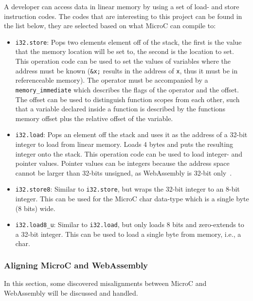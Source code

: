\documentclass[a4paper]{article}
\begin{document}
A developer can access data in linear memory by using a set of load- and store instruction codes. The codes that are interesting to this project can be found in the list below, they are selected based on what MicroC can compile to:
\begin{itemize}
	\item \texttt{i32.store}: Pops two elements element off of the stack, the first is the value that the memory location will be set to, the second is the location to set. This operation code can be used to set the values of variables where the address must be known (\texttt{\&x;} results in the address of \texttt{x}, thus it must be in referenceable memory). The operator must be accompanied by a \texttt{memory\_immediate}\cite[\#memory-related-operators]{website:wasm-binary-encoding} which describes the flags of the operator and the offset. The offset can be used to distinguish function scopes from each other, such that a variable declared inside a function is described by the functions memory offset plus the relative offset of the variable.
	\item \texttt{i32.load}: Pops an element off the stack and uses it as the address of a 32-bit integer to load from linear memory. Loads 4 bytes and puts the resulting integer onto the stack. This operation code can be used to load integer- and pointer values. Pointer values can be integers because the address space cannot be larger than 32-bits unsigned, as WebAssembly is 32-bit only~\cite[\#addressing]{website:wasm-semantics}.
	\item \texttt{i32.store8}: Similar to \texttt{i32.store}, but wraps the 32-bit integer to an 8-bit integer. This can be used for the MicroC char data-type which is a single byte (8 bits) wide.
	\item \texttt{i32.load8\_u}: Similar to \texttt{i32.load}, but only loads 8 bits and zero-extends to a 32-bit integer. This can be used to load a single byte from memory, i.e., a char.
\end{itemize}


\subsubsection{Aligning MicroC and WebAssembly}
\label{sec:problem-analysis:webassembly:aligning}
In this section, some discovered misalignments between MicroC and WebAssembly will be discussed and handled.
\end{document}
